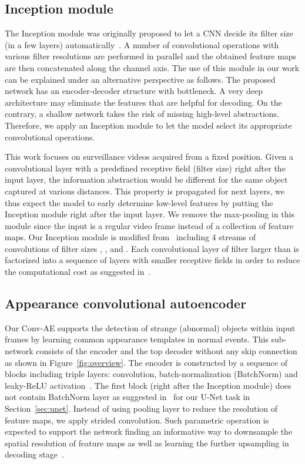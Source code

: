 \documentclass[10pt,twocolumn,letterpaper]{article}
\begin{document}
\subsection{Inception module}
The Inception module was originally proposed to let a CNN decide its filter size (in a few layers) automatically~\cite{Szegedy2015Going}. A number of convolutional operations with various filter resolutions are performed in parallel and the obtained feature maps are then concatenated along the channel axis. The use of this module in our work can be explained under an alternative perspective as follows. The proposed network has an encoder-decoder structure with bottleneck. A very deep architecture may eliminate the features that are helpful for decoding. On the contrary, a shallow network takes the risk of missing high-level abstractions. Therefore, we apply an Inception module to let the model select its appropriate convolutional operations.

This work focuses on surveillance videos acquired from a fixed position. Given a convolutional layer with a predefined receptive field (\ie filter size) right after the input layer, the information abstraction would be different for the same object captured at various distances. This property is propagated for next layers, we thus expect the model to early determine low-level features by putting the Inception module right after the input layer. We remove the max-pooling in this module since the input is a regular video frame instead of a collection of feature maps. Our Inception module is modified from~\cite{Szegedy2016Rethinking} including 4 streams of convolutions of filter sizes , ,  and . Each convolutional layer of filter larger than  is factorized into a sequence of layers with smaller receptive fields in order to reduce the computational cost as suggested in~\cite{Szegedy2016Rethinking}.

\subsection{Appearance convolutional autoencoder}\label{sec:convAE}
Our Conv-AE supports the detection of strange (abnormal) objects within input frames by learning common appearance templates in normal events. This sub-network consists of the encoder and the top decoder without any skip connection as shown in Figure~\ref{fig:overview}. The encoder is constructed by a sequence of blocks including triple layers: convolution, batch-normalization (BatchNorm) and leaky-ReLU activation~\cite{Maas2013Rectifier}. The first block (right after the Inception module) does not contain BatchNorm layer as suggested in~\cite{Isola2017Image} for our U-Net task in Section~\ref{sec:unet}. Instead of using pooling layer to reduce the resolution of feature maps, we apply strided convolution. Such parametric operation is expected to support the network finding an informative way to downsample the spatial resolution of feature maps as well as learning the further upsampling in decoding stage~\cite{Springenberg2014Striving}.
\end{document}
